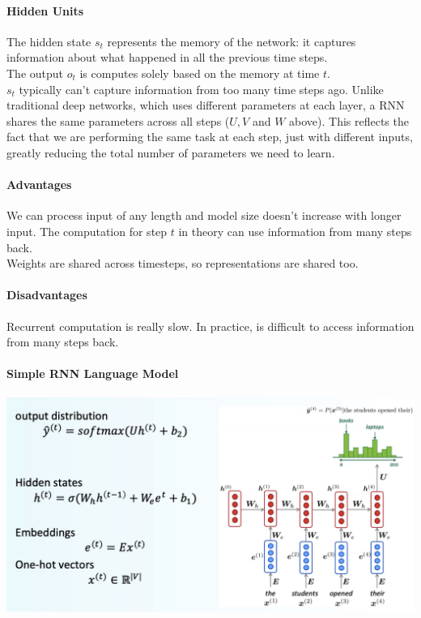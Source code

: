 \documentclass[10pt]{report}
\begin{document}
\paragraph{Hidden Units} The hidden state $s_t$ represents the memory of the network: it captures information about what happened in all the previous time steps.\\
The output $o_t$ is computes solely based on the memory at time $t$.\\
$s_t$ typically can't capture information from too many time steps ago. Unlike traditional deep networks, which uses different parameters at each layer, a RNN shares the same parameters across all steps ($U, V$ and $W$ above). This reflects the fact that we are performing the same task at each step, just with different inputs, greatly reducing the total number of parameters we need to learn.
\paragraph{Advantages} We can process input of any length and model size doesn't increase with longer input. The computation for step $t$ in theory can use information from many steps back.\\
Weights are shared across timesteps, so representations are shared too.
\paragraph{Disadvantages} Recurrent computation is really slow. In practice, is difficult to access information from many steps back.
\paragraph{Simple RNN Language Model}
\begin{center}
	\includegraphics[scale=0.5]{25.png}
\end{center}
\end{document}
